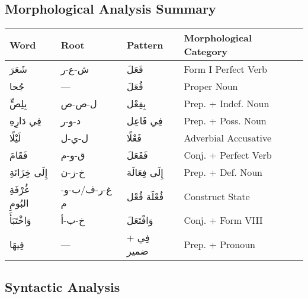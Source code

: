 \documentclass[letter,12pt]{article}
\begin{document}
\subsection{Morphological Analysis Summary}

\begin{tcolorbox}[colback=white,colframe=accentcolor,title=\textbf{Morphological Breakdown},breakable]
\begin{tabular}{|p{3cm}|p{3cm}|p{3cm}|p{4cm}|}
\hline
\textbf{Word} & \textbf{Root} & \textbf{Pattern} & \textbf{Morphological Category} \\
\hline
\textarabic{شَعَرَ} & \textarabic{ش-ع-ر} & \textarabic{فَعَلَ} & Form I Perfect Verb \\
\hline
\textarabic{جُحا} & — & \textarabic{فُعَلَ} & Proper Noun \\
\hline
\textarabic{بِلِصٍّ} & \textarabic{ل-ص-ص} & \textarabic{بِفِعْل} & Prep. + Indef. Noun \\
\hline
\textarabic{فِي دَارِهِ} & \textarabic{د-و-ر} & \textarabic{فِي فَاعِل} & Prep. + Poss. Noun \\
\hline
\textarabic{لَيْلًا} & \textarabic{ل-ي-ل} & \textarabic{فَعْلًا} & Adverbial Accusative \\
\hline
\textarabic{فَقَامَ} & \textarabic{ق-و-م} & \textarabic{فَفَعَلَ} & Conj. + Perfect Verb \\
\hline
\textarabic{إِلَى خِزَانَةِ} & \textarabic{خ-ز-ن} & \textarabic{إِلَى فِعَالَة} & Prep. + Def. Noun \\
\hline
\textarabic{غُرْفَةِ البُومِ} & \textarabic{غ-ر-ف/ب-و-م} & \textarabic{فُعْلَة فُعْل} & Construct State \\
\hline
\textarabic{وَاخْتَبَأَ} & \textarabic{خ-ب-أ} & \textarabic{وَافْتَعَلَ} & Conj. + Form VIII \\
\hline
\textarabic{فِيهَا} & — & \textarabic{فِي + ضمير} & Prep. + Pronoun \\
\hline
\end{tabular}
\end{tcolorbox}

\subsection{Syntactic Analysis}
\end{document}
